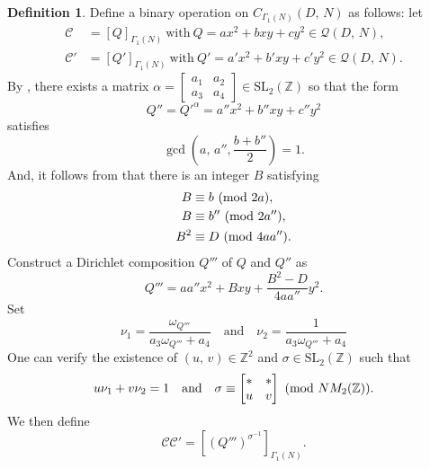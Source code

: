 \documentclass[reqno,11pt]{article}
\newcommand{\Mod}[1]{\ (\textup{mod}\ #1)}
\theoremstyle{plain} %
\theoremstyle{definition} %
\newtheorem{definition}[theorem]{\indent\sc Definition}
\begin{document}
\begin{definition}\label{Noperation}
Define a binary operation on $C_{\Gamma_1(N)}(D,\,N)$
as follows: let 
\begin{align*}
\mathcal{C}&=[Q]_{\Gamma_1(N)}~\textrm{with}~
Q=ax^2+bxy+cy^2\in\mathcal{Q}(D,\,N),\\
\mathcal{C}'&=[Q']_{\Gamma_1(N)}~\textrm{with}~
Q'=a'x^2+b'xy+c'y^2\in\mathcal{Q}(D,\,N).
\end{align*}
By \cite[Lemmas 2.3 and 2.25]{Cox}, there exists a matrix $\alpha
=\begin{bmatrix}a_1&a_2\\a_3&a_4\end{bmatrix}\in\mathrm{SL}_2(\mathbb{Z})$ 
so that the form
\begin{equation*}
Q''=Q'^\alpha=a''x^2+b''xy+c''y^2
\end{equation*}
satisfies
\begin{equation*}
\gcd\left(a,\,a'',\frac{b+b''}{2}\right)=1. 
\end{equation*}
And, it follows from \cite[Lemma 3.2]{Cox} that 
there is an integer $B$ satisfying
\begin{align*}
B&\equiv b\Mod{2a},\\
B&\equiv b''\Mod{2a''},\nonumber\\
B^2&\equiv D\Mod{4aa''}.\nonumber
\end{align*}
Construct a Dirichlet composition $Q'''$ of $Q$ and $Q''$ as
\begin{equation*}
Q'''=aa''x^2+Bxy+\frac{B^2-D}{4aa''}y^2. 
\end{equation*}
Set
\begin{equation*}
\nu_1=\frac{\omega_{Q'''}}{a_3\omega_{Q'''}+a_4}
\quad\textrm{and}\quad
\nu_2=\frac{1}{a_3\omega_{Q'''}+a_4}
\end{equation*}
One can verify the existence of $(u,\,v)\in\mathbb{Z}^2$ and 
$\sigma\in\mathrm{SL}_2(\mathbb{Z})$ such that
\begin{equation*}
u\nu_1+v\nu_2=1\quad\textrm{and}\quad
\sigma\equiv\begin{bmatrix}\mathrm{*} & \mathrm{*}\\
u & v\end{bmatrix}\Mod{NM_2(\mathbb{Z})}. 
\end{equation*}
We then define
\begin{equation}\label{CCF}
\mathcal{C}\mathcal{C}'=\left[(Q''')^{\sigma^{-1}}\right]_{\Gamma_1(N)}. 
\end{equation}
\end{definition}
\end{document}
